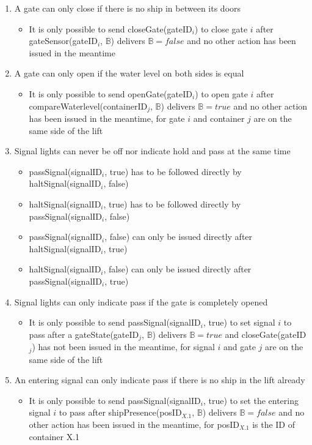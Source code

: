 \begin{enumerate}
	\item A gate can only close if there is no ship in between its doors
	\begin{itemize}
		\item It is only possible to send closeGate(gateID$_i$) to close gate $i$ after gateSensor(gateID$_i$, $\mathbb{B}$) delivers $\mathbb{B} = false$ and no other action has been issued in the meantime
	\end{itemize}
	
	\item A gate can only open if the water level on both sides is equal
	\begin{itemize}
		\item It is only possible to send openGate(gateID$_i$) to open gate $i$ after compareWaterlevel(containerID$_j$, $\mathbb{B}$) delivers $\mathbb{B} = true$ and no other action has been issued in the meantime, for gate $i$ and container $j$ are on the same side of the lift
	\end{itemize}
	
	\item Signal lights can never be off nor indicate hold and pass at the same time
		\begin{itemize}
			\item passSignal(signalID$_i$, true) has to be followed directly by \linebreak haltSignal(signalID$_i$, false)
			\item haltSignal(signalID$_i$, true) has to be followed directly by \linebreak passSignal(signalID$_i$, false)
			\item passSignal(signalID$_i$, false) can only be issued directly after \linebreak haltSignal(signalID$_i$, true)
			\item haltSignal(signalID$_i$, false) can only be issued directly after \linebreak passSignal(signalID$_i$, true)
		\end{itemize}
	\item Signal lights can only indicate pass if the gate is completely opened
		\begin{itemize}
			\item It is only possible to send passSignal(signalID$_i$, true) to set signal $i$ to pass after a gateState(gateID$_j$, $ \mathbb{B} $) delivers $\mathbb{B} = true$ and closeGate(gateID$_j$) has not been issued in the meantime, for signal $i$ and gate $j$ are on the same side of the lift
		\end{itemize}
	\item An entering signal can only indicate pass if there is no ship in the lift already
		\begin{itemize}
			\item It is only possible to send passSignal(signalID$_i$, true) to set the entering signal $i$ to pass after shipPresence(posID$_{X.1}$, $\mathbb{B}$) delivers $\mathbb{B} = false$ and no other action has been issued in the meantime, for posID$_{X.1}$ is the ID of container X.1
		\end{itemize}
\end{enumerate}

